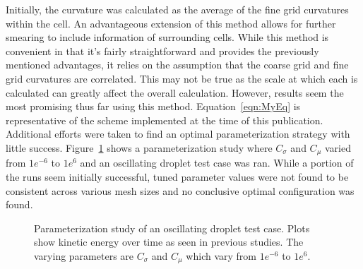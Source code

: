  Initially, the curvature was calculated as the average of the fine grid curvatures within the cell. An advantageous extension of this method  allows for further smearing to include information of surrounding cells. While this method is convenient in that it's fairly straightforward and provides the previously mentioned advantages, it relies on the assumption that the coarse grid and fine grid curvatures are correlated. This may not be true as the scale at which each is calculated can greatly affect the overall calculation. However, results seem the most promising thus far using this method. Equation~\ref{eqn:MyEq} is representative of the scheme implemented at the time of this publication.  Additional efforts were taken to  find an optimal parameterization strategy with little success. Figure~\ref{fig:para} shows a parameterization study where $C_{\sigma}$ and $C_{\mu}$ varied from $1e^{-6}$ to $1e^6$ and an oscillating droplet test case was ran. While a portion of the runs seem initially successful, tuned parameter values were not found to be consistent across various mesh sizes and no conclusive optimal configuration was found. 
\begin{figure}[htbp]
	\centering
	\caption{Parameterization study of an oscillating droplet test case. Plots show kinetic energy over time as seen in previous studies. The varying parameters are $C_{\sigma}$ and $C_{\mu}$ which vary from $1e^{-6}$ to $1e^6$.}
	\label{fig:para}
\end{figure}


